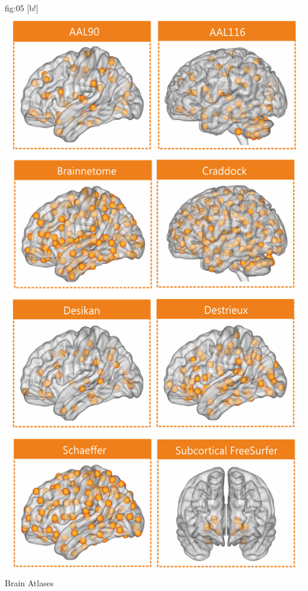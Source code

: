 \documentclass[justified]{tufte-handout}
\begin{document}
	{fig:05}
	{
	[b!]
	\includegraphics{tut_ba/fig05.png}
	}
	{Brain Atlases}
\end{document}
